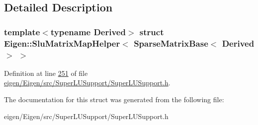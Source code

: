 \subsection{Detailed Description}
\subsubsection*{template$<$typename Derived$>$\newline
struct Eigen\+::\+Slu\+Matrix\+Map\+Helper$<$ Sparse\+Matrix\+Base$<$ Derived $>$ $>$}



Definition at line \hyperlink{eigen_2_eigen_2src_2_super_l_u_support_2_super_l_u_support_8h_source_l00251}{251} of file \hyperlink{eigen_2_eigen_2src_2_super_l_u_support_2_super_l_u_support_8h_source}{eigen/\+Eigen/src/\+Super\+L\+U\+Support/\+Super\+L\+U\+Support.\+h}.



The documentation for this struct was generated from the following file\+:\begin{DoxyCompactItemize}
\item 
eigen/\+Eigen/src/\+Super\+L\+U\+Support/\+Super\+L\+U\+Support.\+h\end{DoxyCompactItemize}
